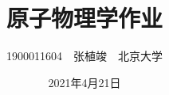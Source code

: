\documentclass[a4paper,fontset=none]{ctexart}
\begin{document}
\title{\textbf{原子物理学作业}}
\author{1900011604\ \ 张植竣\ \ 北京大学}
\date{2021年4月21日}

\maketitle
\end{document}
